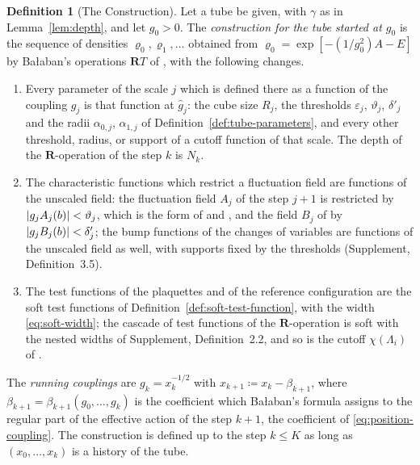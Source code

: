\documentclass[11pt]{preprint}
\DeclarePairedDelimiter{\abs}{\lvert}{\rvert}
\numberwithin{equation}{section}
\theoremstyle{definition}
\newtheorem{definition}[theorem]{Definition}
\theoremstyle{remark}
\theoremstyle{plain}
\begin{document}
\begin{definition}[The Construction]\label{def:construction}
Let a tube be given, with $\gamma$ as in Lemma~\ref{lem:depth}, and let $g_0 > 0$. The \emph{construction for the tube started at $g_0$} is the sequence of densities $\varrho_0, \varrho_1, \dots$ obtained from $\varrho_0 = \exp[-(1/g_0^2)A - E]$ by Ba{\l}aban's operations $\mathbf RT$ of \cite{BalabanCRE,BalabanLFR1,BalabanLFR2}, with the following changes.
\begin{enumerate}[label=(\roman*)]
\item Every parameter of the scale $j$ which is defined there as a function of the coupling $g_j$ is that function at $\hat g_j$: the cube size $R_j$, the thresholds $\varepsilon_j$, $\vartheta_j$, $\delta'_j$ and the radii $\alpha_{0,j}$, $\alpha_{1,j}$ of Definition~\ref{def:tube-parameters}, and every other threshold, radius, or support of a cutoff function of that scale. The depth of the $\mathbf R$-operation of the step $k$ is $N_k$.
\item The characteristic functions which restrict a fluctuation field are functions of the unscaled field: the fluctuation field $A_j$ of the step $j + 1$ is restricted by $\abs{g_jA_j(b)} < \vartheta_j$, which is the form of \cite[(1.18), p.~250]{BalabanCRE} and \cite[(1.9), p.~178]{BalabanLFR1}, and the field $B_j$ of \cite[(1.55), p.~188]{BalabanLFR1} by $\abs{g_jB_j(b)} < \delta'_j$; the bump functions of the changes of variables \cite[(1.22), p.~251]{BalabanCRE} are functions of the unscaled field as well, with supports fixed by the thresholds (Supplement, Definition~3.5).
\item The test functions of the plaquettes and of the reference configuration are the soft test functions of Definition~\ref{def:soft-test-function}, with the width \eqref{eq:soft-width}; the cascade of test functions of the $\mathbf R$-operation \cite[(1.22)--(1.24), p.~181]{BalabanLFR1} is soft with the nested widths of Supplement, Definition~2.2, and so is the cutoff $\chi(\Lambda_i)$ of \cite[(1.101), p.~201]{BalabanLFR1}.
\end{enumerate}
The \emph{running couplings} are $g_k = x_k^{-1/2}$ with $x_{k+1} \coloneqq x_k - \beta_{k+1}$, where $\beta_{k+1} = \beta_{k+1}(g_0, \dots, g_k)$ is the coefficient which Ba{\l}aban's formula \cite[(3.61), p.~282]{BalabanCRE} assigns to the regular part of the effective action of the step $k + 1$, the coefficient of \eqref{eq:position-coupling}. The construction is defined up to the step $k \leq K$ as long as $(x_0, \dots, x_k)$ is a history of the tube.
\end{definition}
\end{document}
